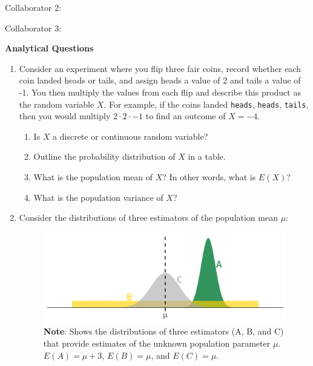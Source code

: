 \documentclass[11pt]{article}
\begin{document}
\begin{onehalfspacing}
Collaborator 2: \\
			
\vspace{0.1in}

Collaborator 3: 
			

\newpage


\begin{center}
\textbf{Analytical Questions} \bigskip
\end{center}


\begin{enumerate}
	
\item Consider an experiment where you flip three fair coins, record whether each coin landed heads or tails, and assign heads a value of 2 and tails a value of -1. You then multiply the values from each flip and describe this product as the random variable $X$. For example, if the coins landed \texttt{heads}, \texttt{heads}, \texttt{tails}, then you would multiply $2 \cdot 2 \cdot -1$ to find an outcome of $X = -4$.
\begin{enumerate}[label=(\alph*)]
	\item Is $X$ a discrete or continuous random variable?
	\item Outline the probability distribution of $X$ in a table.
	\item What is the population mean of $X$? In other words, what is $E(X)$?
	\item What is the population variance of $X$?
\end{enumerate}

\bigskip

\item Consider the distributions of three estimators of the population mean $\mu$:

\begin{figure}[H]
	\centering
	\includegraphics[width=\textwidth]{estimators.png}
	\caption*{\textbf{Note}: Shows the distributions of three estimators (A, B, and C) that provide estimates of the unknown population parameter $\mu$. $E(A) = \mu + 3$,  $E(B) = \mu$, and  $E(C) = \mu$.}
\end{figure}


\end{enumerate}
\end{onehalfspacing}
\end{document}

